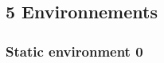 \documentclass[a4paper,10pt]{article}
\begin{document}
\subsection{5 Environnements}
\newcommand{\imgSize}{0.45\textwidth}
% 

\subsubsection{Static environment 0}
\end{document}
